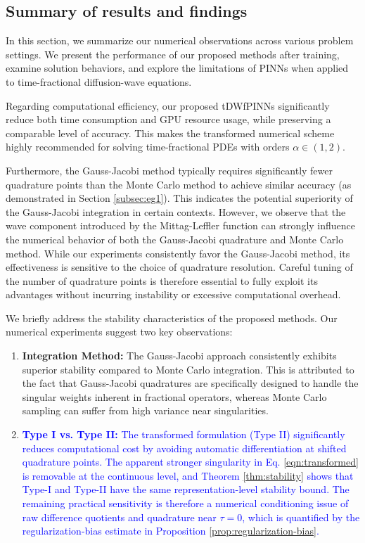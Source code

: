 \documentclass[preprint,3p,times]{elsarticle}
\newcommand{\revise}[1]{\textcolor{blue}{#1}}
\begin{document}
\subsection{Summary of results and findings}
In this section, we summarize our numerical observations across various problem settings. We present the performance of our proposed methods after training, examine solution behaviors, and explore the limitations of PINNs when applied to time-fractional diffusion-wave equations.

Regarding computational efficiency, our proposed tDWfPINNs significantly reduce both time consumption and GPU resource usage, while preserving a comparable level of accuracy. This makes the transformed numerical scheme highly recommended for solving time-fractional PDEs with orders $\alpha \in (1, 2)$.

Furthermore, the Gauss-Jacobi method typically requires significantly fewer quadrature points than the Monte Carlo method to achieve similar accuracy (as demonstrated in Section \ref{subsec:eg1}). This indicates the potential superiority of the Gauss-Jacobi integration in certain contexts. However, we observe that the wave component introduced by the Mittag-Leffler function can strongly influence the numerical behavior of both the Gauss-Jacobi quadrature and Monte Carlo method. While our experiments consistently favor the Gauss-Jacobi method, its effectiveness is sensitive to the choice of quadrature resolution. Careful tuning of the number of quadrature points is therefore essential to fully exploit its advantages without incurring instability or excessive computational overhead.


\begin{remark}
    We briefly address the stability characteristics of the proposed methods. Our numerical experiments suggest two key observations:
\begin{enumerate}
    \item \textbf{Integration Method:} The Gauss-Jacobi approach consistently exhibits superior stability compared to Monte Carlo integration. This is attributed to the fact that Gauss-Jacobi quadratures are specifically designed to handle the singular weights inherent in fractional operators, whereas Monte Carlo sampling can suffer from high variance near singularities.
    \item \revise{\textbf{Type I vs. Type II:} The transformed formulation (Type II) significantly reduces computational cost by avoiding automatic differentiation at shifted quadrature points. The apparent stronger singularity in Eq. \eqref{eqn:transformed} is removable at the continuous level, and Theorem \ref{thm:stability} shows that Type-I and Type-II have the same representation-level stability bound. The remaining practical sensitivity is therefore a numerical conditioning issue of raw difference quotients and quadrature near $\tau=0$, which is quantified by the regularization-bias estimate in Proposition \ref{prop:regularization-bias}.}
\end{enumerate}
    
\end{remark}
\end{document}
